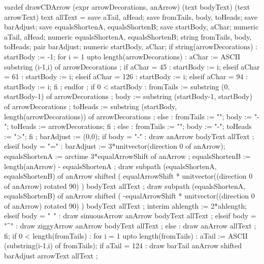   vardef drawCDArrow
    (expr arrowDecorations, anArrow)
    (text bodyText)
    (text arrowText)
    text allText =
    save aTail, aHead;
    save fromTails, body, toHeads;
    save barAdjust;
    save equalsShortenA, equalsShortenB;
    save startBody, aChar;
    numeric aTail, aHead;
    numeric equalsShortenA, equalsShortenB;
    string fromTails, body, toHeads;
    pair barAdjust;
    numeric startBody, aChar;
    if string(arrowDecorations) :
      startBody  := -1;
      for i = 1 upto length(arrowDecorations) :
        aChar := ASCII substring (i-1,i) of arrowDecorations ; 
        if aChar = 45 : %
          startBody := i;
        elseif aChar = 61 : %
          startBody := i;
        elseif aChar = 126 : %
          startBody := i;
        elseif aChar = 94 : %
          startBody := i;
        fi ;
      endfor ; 
      if 0 < startBody :
        fromTails := 
          substring (0, startBody-1)
          of arrowDecorations ;
        body      :=
          substring (startBody-1, startBody)
          of arrowDecorations ;
        toHeads   := 
          substring (startBody, length(arrowDecorations)) 
          of arrowDecorations ;
      else : 
        fromTails := "";
        body      := "-";
        toHeads   := arrowDecorations;
      fi ;
    else :
      fromTails := "";
      body      := "-";
      toHeads   := ">";
    fi ;
    barAdjust := (0,0);
    if body = "-" :
      draw anArrow bodyText allText ; 
    elseif body = "=" :
      barAdjust := 3*unitvector(direction 0 of anArrow);
      equalsShortenA := arctime 3*equalArrowShift of anArrow ;
      equalsShortenB := length(anArrow) - equalsShortenA ;
      draw subpath (equalsShortenA, equalsShortenB) of anArrow
        shifted (
          equalArrowShift *
          unitvector((direction 0 of anArrow) rotated 90)
        )
        bodyText allText ;
      draw subpath (equalsShortenA, equalsShortenB) of anArrow
        shifted (
          -equalArrowShift *
          unitvector((direction 0 of anArrow) rotated 90)
        )
        bodyText allText ;
      interim ahlength := 2*ahlength;
    elseif body = "~" :
      draw sinuousArrow anArrow bodyText allText ;
    elseif body = "^" :
      draw ziggyArrow anArrow bodyText allText ;
    else :
      draw anArrow allText ; 
    fi;
    if 0 < length(fromTails) :
      for i = 1 upto length(fromTails) :
        aTail := ASCII (substring(i-1,i) of fromTails);
        if aTail = 124 : %
          draw barTail anArrow
            shifted barAdjust
            arrowText allText ;
